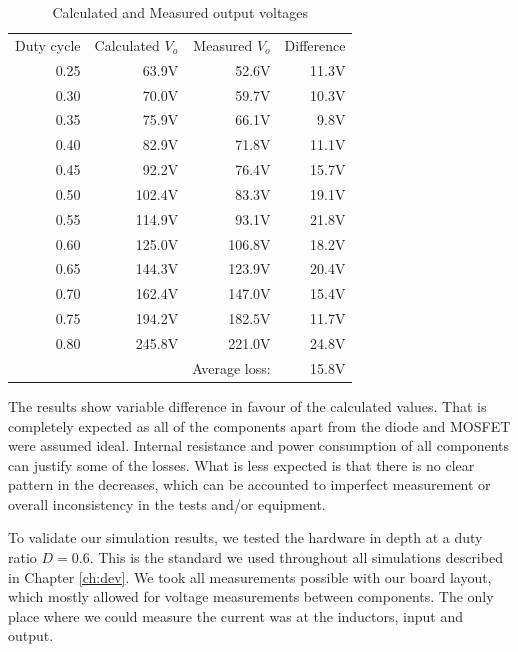 \begin{table}[H]
\begin{center}
\caption {Calculated and Measured output voltages} \label{tab:V_OUT_ALL} 
\vspace{-1mm}
\begin{tabular}{|r|r|r|r|}
\cline{1-4}
Duty cycle & Calculated $V_o$ & Measured $V_o$& Difference \\ \cline{1-4}
0.25&	63.9V & 52.6V & 11.3V \\ \cline{1-4}
0.30&	70.0V & 59.7V & 10.3V \\ \cline{1-4}
0.35&	75.9V & 66.1V & 9.8V \\ \cline{1-4}
0.40&	82.9V & 71.8V & 11.1V \\ \cline{1-4}
0.45&	92.2V & 76.4V & 15.7V \\ \cline{1-4}
0.50&	102.4V & 83.3V & 19.1V \\ \cline{1-4}
0.55&	114.9V & 93.1V & 21.8V \\ \cline{1-4}
0.60&	125.0V & 106.8V & 18.2V\\ \cline{1-4}
0.65&	144.3V & 123.9V & 20.4V \\ \cline{1-4}
0.70&	162.4V & 147.0V & 15.4V\\ \cline{1-4}
0.75&	194.2V & 182.5V & 11.7V \\ \cline{1-4}
0.80&	245.8V & 221.0V & 24.8V\\ \cline{1-4}
&	 & Average loss:  & 15.8V \\ \cline{1-4}
\end{tabular}
\end{center}
\end{table}

The results show variable difference in favour of the calculated values. That is completely expected as all of the components apart from the diode and MOSFET were assumed ideal. Internal resistance and power consumption of all components can justify some of the losses. What is less expected is that there is no clear pattern in the decreases, which can be accounted to imperfect measurement or overall inconsistency in the tests and/or equipment. 

To validate our simulation results,
we tested the hardware in depth at a duty ratio $D = 0.6$.
This is the standard we used throughout all simulations described in Chapter \ref{ch:dev}.
We took all measurements possible with our board layout,
which mostly allowed for voltage measurements between components.
The only place where we could measure the current was at the inductors, input and output.

